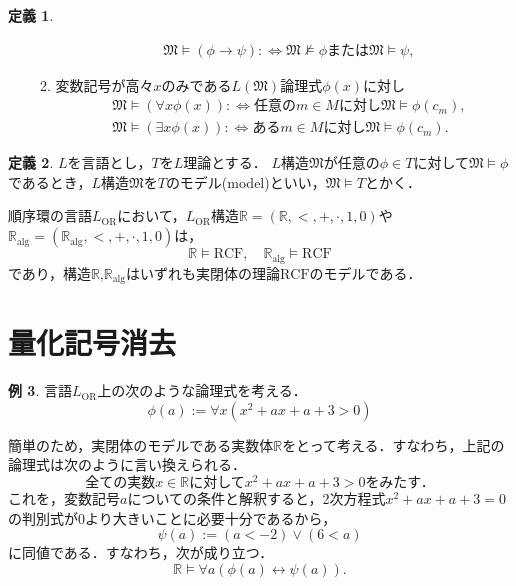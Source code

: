 \documentclass[uplatex, dvipdfmx]{jsarticle}
\numberwithin{equation}{section}
\newcommand{\R}{\mathbb{R}}
\newcommand{\Ralg}{\mathbb{R}_\mathrm{alg}}
\newcommand{\M}{\mathfrak{M}}
\newcommand{\defiff}{ :\Leftrightarrow}
\newcommand{\RCF}{\mathrm{RCF}}
\theoremstyle{definition}
\newtheorem{definition}{定義}[section]
\newtheorem{example}[definition]{例}
\begin{document}
\begin{definition}
\begin{itemize}
\begin{enumerate}
\begin{align}
                    &\M \models (\phi \rightarrow \psi) \defiff \M \not\models \phi \text{または} \M \models \psi,
               \end{align}
               \item 変数記号が高々$x$のみである$L(\M)$論理式$\phi(x)$に対し
               \begin{align}
                    &\M \models (\forall x \phi(x)) \defiff \text{任意の$m \in M$に対し}\M \models \phi(c_m),\\
                    &\M \models (\exists x \phi(x)) \defiff \text{ある$m \in M$に対し}\M \models\phi(c_m).
               \end{align}
          \end{enumerate}
     \end{itemize}
\end{definition}

\begin{definition}
     $L$を言語とし，$T$を$L$理論とする．
     $L$構造$\M$が任意の$\phi \in T$に対して$\M\models \phi$であるとき，$L$構造$\M$を$T$のモデル(model)といい，$\M \models T$とかく．
\end{definition}

順序環の言語$L_{\mathrm{OR}}$において，$L_\mathrm{OR}$構造$\R=(\R,<,+,\cdot,1,0)$や$\Ralg=(\Ralg,<,+,\cdot,1,0)$は，
\begin{equation}
     \R \models \RCF, \quad \Ralg \models \RCF
\end{equation}
であり，構造$\R$,$\Ralg$はいずれも実閉体の理論$\RCF$のモデルである．

\section{量化記号消去}

\begin{example}
     言語$L_\mathrm{OR}$上の次のような論理式を考える．
     \begin{equation}
          \phi(a) := \forall x (x^2 + ax + a + 3 > 0)
     \end{equation}

     簡単のため，実閉体のモデルである実数体$\R$をとって考える．すなわち，上記の論理式は次のように言い換えられる．
     \begin{equation}
          \text{全ての実数$x \in \R$に対して$x^2 + ax + a + 3 > 0$をみたす．}  
     \end{equation}
     これを，変数記号$a$についての条件と解釈すると，2次方程式$x^2 + ax + a + 3 = 0$の判別式が0より大きいことに必要十分であるから，
     \begin{equation}
          \psi(a) := (a < -2) \lor (6 < a)
     \end{equation}
     に同値である．すなわち，次が成り立つ．
     \begin{equation}
          \R \models \forall a (\phi(a) \leftrightarrow \psi(a)).
     \end{equation}
\end{example}
\end{document}
